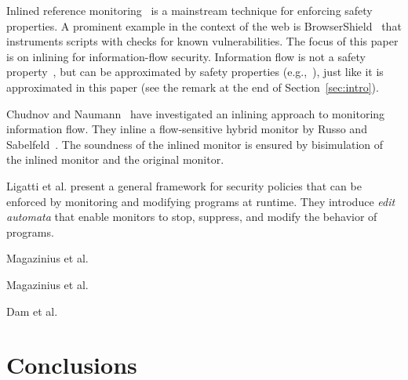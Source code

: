 \documentclass{llncs}
\begin{document}
Inlined reference monitoring~\cite{Erlingsson:PhD04} is a mainstream
technique for enforcing safety properties. 
A prominent example in the context of the web is
BrowserShield~\cite{Reis+:TWeb07} that instruments scripts with
checks for known vulnerabilities.
The focus of this paper is on inlining for information-flow security. Information flow is not
a safety property~\cite{McLean:SSP94}, but can be approximated by
safety properties
(e.g.,~\cite{Boudol:FAST08,Sabelfeld:Russo:PSI09,Austin:Flanagan:PLAS09}),
just like it is approximated in this paper (see the remark at the end of Section~\ref{sec:intro}).

Chudnov and
Naumann~\cite{Chudnov:Naumann:CSF10} have investigated an inlining
approach to monitoring information flow. They inline a flow-sensitive
hybrid monitor by Russo and
Sabelfeld~\cite{Russo:Sabelfeld:CSF10}. The soundness of the inlined
monitor is ensured by bisimulation of the inlined monitor and the
original monitor.

Ligatti et al. \cite{Ligatti05editautomata:} present a 
general framework for security policies that can
be enforced by monitoring and modifying programs at runtime. 
They introduce \emph{edit automata} that enable
monitors to stop, suppress, and modify the behavior of programs. 

Magazinius et al.~\cite{DBLP:conf/nordsec/MagaziniusPS10}

Magazinius et al.~\cite{DBLP:journals/compsec/MagaziniusRS12}

Dam et al.~\cite{DBLP:conf/ecoop/DamJLP09,DBLP:journals/jcs/DamJLP10,DBLP:conf/ccs/DamGL12}

\section{Conclusions}
\label{sec:conc}



\end{document}
